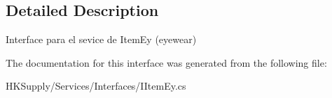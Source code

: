 \subsection{Detailed Description}
Interface para el sevice de Item\+Ey (eyewear) 



The documentation for this interface was generated from the following file\+:\begin{DoxyCompactItemize}
\item 
H\+K\+Supply/\+Services/\+Interfaces/I\+Item\+Ey.\+cs\end{DoxyCompactItemize}

